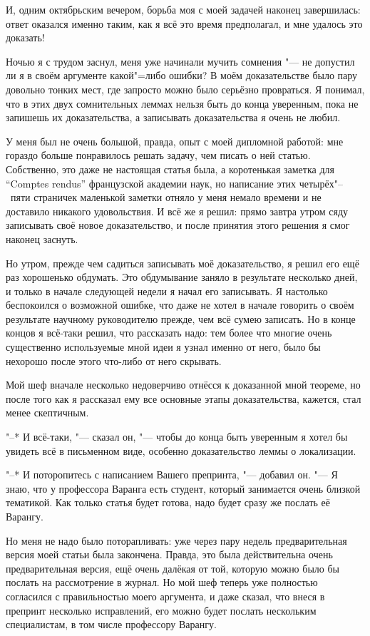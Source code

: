 И, одним октябрьским вечером, борьба моя с моей задачей наконец завершилась:
ответ оказался именно таким, как я всё это время предполагал, и мне удалось это
доказать!

Ночью я с трудом заснул, меня уже начинали мучить сомнения "--- не допустил ли
я в своём аргументе какой"=либо ошибки?
В моём доказательстве было пару довольно тонких мест, где запросто можно было
серьёзно провраться.
Я понимал, что в этих двух сомнительных леммах нельзя быть до конца уверенным,
пока не запишешь их доказательства, а записывать доказательства я очень не любил.

У меня был не очень большой, правда, опыт с моей дипломной работой:
мне гораздо больше понравилось решать задачу, чем писать о ней статью.
Собственно, это даже не настоящая статья была, а коротенькая заметка для
\enquote{\foreignlanguage{french}{Comptes rendus}}
французской академии наук, но написание этих четырёх"--~пяти страничек маленькой
заметки отняло у меня немало времени и не доставило никакого удовольствия.
И всё же я решил: прямо завтра утром сяду записывать своё новое доказательство,
и после принятия этого решения я смог наконец заснуть.

Но утром, прежде чем садиться записывать моё доказательство, я решил его ещё раз
хорошенько обдумать.
Это обдумывание заняло в результате несколько дней, и только в начале следующей
недели я начал его записывать.
Я настолько беспокоился о возможной ошибке, что даже не хотел в начале говорить
о своём результате научному руководителю прежде, чем всё сумею записать.
Но в конце концов я всё-таки решил, что рассказать надо:
тем более что многие очень существенно используемые мной идеи я узнал именно от
него, было бы нехорошо после этого что-либо от него скрывать.

Мой шеф вначале несколько недоверчиво отнёсся к доказанной мной теореме, но
после того как я рассказал ему все основные этапы доказательства, кажется, стал
менее скептичным.

"--* И всё-таки, "--- сказал он, "--- чтобы до конца быть уверенным я хотел
бы увидеть всё в письменном виде, особенно доказательство леммы о локализации.

"--* И поторопитесь с написанием Вашего препринта, "--- добавил он.
"--- Я знаю, что у профессора Варанга есть студент, который занимается очень
близкой тематикой.
Как только статья будет готова, надо будет сразу же послать её Варангу.

Но меня не надо было поторапливать:
уже через пару недель предварительная версия моей статьи была закончена.
Правда, это была действительна очень предварительная версия, ещё очень далёкая
от той, которую можно было бы послать на рассмотрение в журнал.
Но мой шеф теперь уже полностью согласился с правильностью моего аргумента, и
даже сказал, что внеся в препринт несколько исправлений, его можно будет послать
нескольким специалистам, в том числе профессору Варангу.

